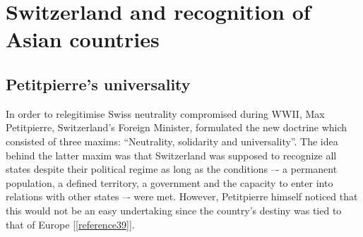 \documentclass[a4paper]{article}
\begin{document}
\section{Switzerland and recognition of Asian countries}
\subsection{Petitpierre's universality}
In order to relegitimise Swiss neutrality compromised during WWII, Max Petitpierre, Switzerland’s Foreign Minister, formulated the new doctrine which consisted of three maxims: “Neutrality, solidarity and universality”. The idea behind the latter maxim was that Switzerland was supposed to recognize all states despite their political regime as long as the conditions –- a permanent population, a defined territory, a government and the capacity to enter into relations with other states –- were met. However, Petitpierre himself noticed that this would not be an easy undertaking since the country’s destiny was tied to that of Europe [\ref{reference39}]. 
\end{document}
